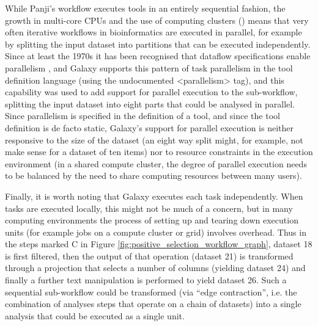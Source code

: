 \documentclass[a4paper,10pt]{scrreprt} \usepackage[utf8]{inputenc}
\begin{document}
While Panji's workflow executes tools in an entirely sequential fashion, the growth in multi-core CPUs and the use of computing clusters (\cite{stein_towards_2008}) means that very often iterative workflows in bioinformatics are executed in parallel, for example by splitting the input dataset into partitions that can be executed independently. Since at least the 1970s it has been recognised that dataflow specifications enable parallelism \cite{gostelow_view_1979}, and Galaxy supports this pattern of task parallelism in the tool definition language (using the undocumented <parallelism> tag), and this capability was used to add support for parallel execution to the sub-workflow, splitting the input dataset into eight parts that could be analysed in parallel. Since parallelism is specified in the definition of a tool, and since the tool definition is de facto static, Galaxy's support for parallel execution is neither responsive to the size of the dataset (an eight way split might, for example, not make sense 
for a dataset of ten items) nor to resource constraints in the execution environment (in a shared compute cluster, the degree of parallel execution needs to be balanced by the need to share computing resources between many users).

Finally, it is worth noting that Galaxy executes each task independently. When tasks are executed locally, this might not be much of a concern, but in many computing environments the process of setting up and tearing down execution units (for example jobs on a compute cluster or grid) involves overhead. Thus in the steps marked C in Figure \ref{fig:positive_selection_workflow_graph}, dataset 18 is first filtered, then the output of that operation (dataset 21) is transformed through a projection that selects a number of columns (yielding dataset 24) and finally a further text manipulation is performed to yield dataset 26. Such a sequential sub-workflow could be transformed (via ``edge contraction'', i.e. the combination of analyses steps that operate on a chain of datasets) into a single analysis that could be executed as a single unit.
\end{document}
